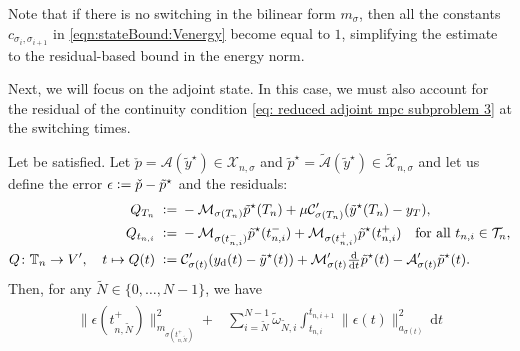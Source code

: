 \documentclass[reqno]{amsart}
\newcommand{\X}{{\mathscr X}}
\newcommand{\timeInt}{\mathbb{T}}
\newcommand{\adState}{p}
\newcommand{\desired}[1]{#1_{\mathrm{d}}}
\newcommand{\outVar}{y}
\newcommand{\outVarDes}{\desired{y}}
\newcommand{\dt}{\,\mathrm{d}t}
\newcommand{\ddt}{\tfrac{\mathrm{d}}{\mathrm{d}t}}
\newcommand{\mOper}{\calM}
\newcommand{\aOper}{\calA}
\newcommand{\cOper}{\calC}
\newcommand{\solA}{\mathcal{A}}
\newcommand{\switch}{\sigma}
\newcommand{\nrSwitches}{N}
\newcommand{\reduce}[1]{\tilde{#1}}
\newcommand{\Xred}{\reduce{\X}}
\newcommand{\addErr}{\epsilon}
\newcommand{\adResidual}{Q}
\newcommand{\adStateRed}{\reduce{\adState}}
\newcommand{\outVarRed}{\reduce{\outVar}}
\newcommand{\optAdStateRed}{\adStateRed^\star}
\newcommand{\optOutVarRed}{\outVarRed^\star}
\newcommand{\intermediateAdStateB}{\check{\adState}}
\newcommand{\calA}{\mathcal{A}}
\newcommand{\calC}{\mathcal{C}}
\newcommand{\calM}{\mathcal{M}}
\newcommand{\calT}{\mathcal{T}}
\begin{document}
%
\begin{remark}
    Note that if there is no switching in the bilinear form $m_\switch$, then all the constants $c_{\switch_i, \switch_{i+1}}$ in \eqref{eqn:stateBound:Venergy} become equal to $1$, simplifying the estimate to the residual-based bound in the energy norm.
\end{remark}
%
Next, we will focus on the adjoint state. In this case, we must also account for the residual of the continuity condition \eqref{eq: reduced adjoint mpc subproblem 3} at the switching times.
%
\begin{lemma}
	\label{thm:errorBoundAdjointEnergy}
	Let  be satisfied. Let $\intermediateAdStateB=\solA(\optOutVarRed) \in \X_{n,\switch}$ and $\optAdStateRed=\reduce \solA(\optOutVarRed) \in \Xred_{n,\switch}$ 
 and let us define the error $\addErr \vcentcolon= \intermediateAdStateB - \optAdStateRed$ and the residuals:
	\begin{align*}
 \begin{aligned}
		\adResidual_{T_n} \;\vcentcolon=&\; -\mOper_{\switch(T_n)} \optAdStateRed(T_n) + \mu \cOper_{\switch(T_n)}' (\optOutVarRed(T_n) - \outVar_T), \\
        \adResidual_{t_{n,i}} \;\vcentcolon=&\; -\mOper_{\switch(t_{n,i}^-)} \optAdStateRed(t_{n,i}^-) +\mOper_{\switch(t_{n,i}^+)} \optAdStateRed(t_{n,i}^+) \quad \text{for all } t_{n,i}\in\calT_n,\\
		\adResidual \colon \timeInt_n\to V',\quad t\mapsto \adResidual(t) \;\vcentcolon=&\; \cOper_{\switch(t)}' (\outVarDes(t) - \optOutVarRed(t)) + \mOper_{\switch(t)}' \ddt{\optAdStateRed}(t) - \aOper_{\switch(t)}' \optAdStateRed(t).
  \end{aligned}
	\end{align*}
    Then, for any $\tilde{\nrSwitches}\in\{0,\ldots,\nrSwitches-1\}$, we have
    \begin{align}\label{eqn:adj:est:rel}
    \begin{aligned}             \|\addErr(t_{n,\tilde{\nrSwitches}}^+)\|_{m_{\switch(t^+_{n,\tilde{\nrSwitches}})}}^2 +& \sum_{i=\tilde \nrSwitches }^{\nrSwitches-1}\tilde \omega_{\tilde \nrSwitches,i}\int_{t_{n,i}}^{t_{n,i+1}}  \|\addErr(t)\|^2_{a_{\switch(t)}}\dt\\

\end{aligned}
\end{align}
\end{lemma}
\end{document}

